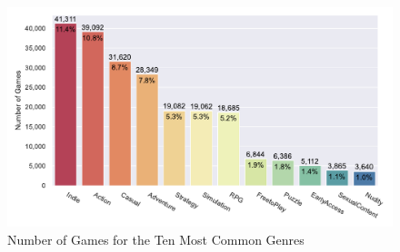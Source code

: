 \begin{figure}[ht]
    \centering
    \includegraphics[width=\textwidth]{data/results/plots/tags_plot}
    \caption{Number of Games for the Ten Most Common Genres}
    \label{fig:genre_plot}
\end{figure}